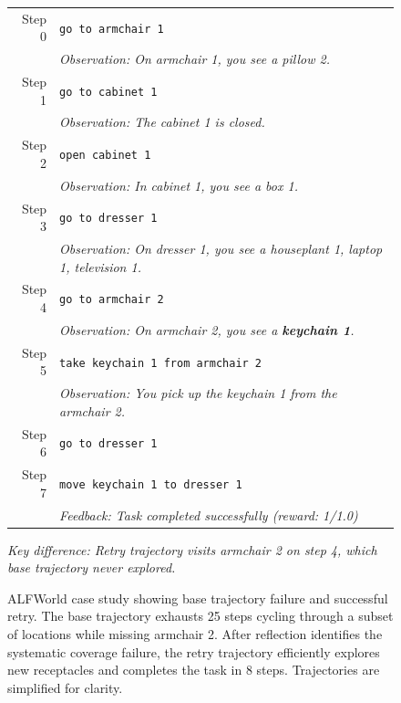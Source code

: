 \begin{figure}[thb]
\begin{tcolorbox}[
    colback=white,
    colframe=black!70,
    title=\textbf{Retry Trajectory (guidance removed for training)},
    fonttitle=\bfseries\small,
    width=\textwidth,
    boxrule=0.5pt
]
\vspace{0.5em}
\footnotesize
\begin{tabular}{@{}r@{\hspace{0.8em}}p{13cm}@{}}
Step 0 & \texttt{go to armchair 1} \\
       & \textit{Observation: On armchair 1, you see a pillow 2.} \\[0.3em]
Step 1 & \texttt{go to cabinet 1} \\
       & \textit{Observation: The cabinet 1 is closed.} \\[0.3em]
Step 2 & \texttt{open cabinet 1} \\
       & \textit{Observation: In cabinet 1, you see a box 1.} \\[0.3em]
Step 3 & \texttt{go to dresser 1} \\
       & \textit{Observation: On dresser 1, you see a houseplant 1, laptop 1, television 1.} \\[0.3em]
Step 4 & \texttt{go to armchair 2} \\
       & \textit{Observation: On armchair 2, you see a \textbf{keychain 1}.} \\[0.3em]
Step 5 & \texttt{take keychain 1 from armchair 2} \\
       & \textit{Observation: You pick up the keychain 1 from the armchair 2.} \\[0.3em]
Step 6 & \texttt{go to dresser 1} \\[0.3em]
Step 7 & \texttt{move keychain 1 to dresser 1} \\
       & \textit{Feedback: Task completed successfully (reward: 1/1.0)} \\
\end{tabular}

\vspace{0.3em}
\textit{Key difference: Retry trajectory visits armchair 2 on step 4, which base trajectory never explored.}

\end{tcolorbox}

\caption{ALFWorld case study showing base trajectory failure and successful retry. The base trajectory exhausts 25 steps cycling through a subset of locations while missing armchair 2. After reflection identifies the systematic coverage failure, the retry trajectory efficiently explores new receptacles and completes the task in 8 steps. Trajectories are simplified for clarity.}
\label{fig:case_alfworld}
\end{figure}

